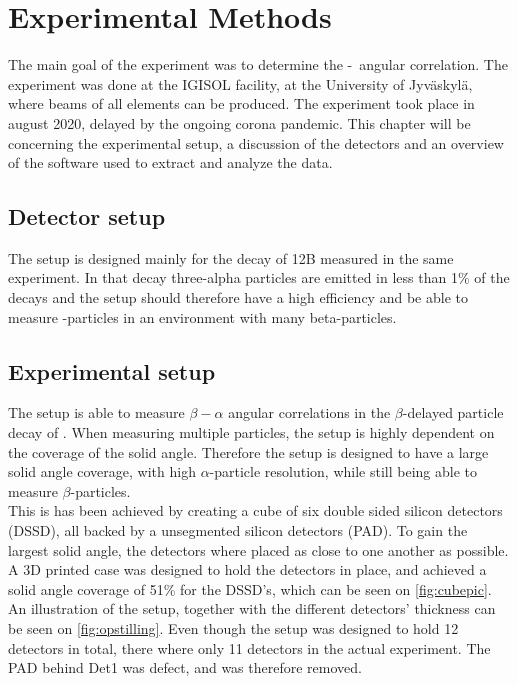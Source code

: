 \chapter{Experimental Methods}
The main goal of the experiment was to determine the \be-\al\ angular correlation. The experiment was done at the IGISOL facility, at the University of Jyväskylä, where beams of all elements can be produced. The experiment took place in august 2020, delayed by the ongoing corona pandemic. This chapter will be concerning the experimental setup, a discussion of the detectors and an overview of the software used to extract and analyze the data. 

\section{Detector setup}

The setup is designed mainly for the decay of 12B measured in the same experiment. In that decay three-alpha particles are emitted in less than 1\% of the decays and the setup should therefore have a high efficiency and be able to measure \al-particles in an environment with many beta-particles. 
\section{Experimental setup}
The setup is able to measure $\beta-\alpha$ angular correlations in the $\beta$-delayed particle decay of . When measuring multiple particles, the setup is highly dependent on the coverage of the solid angle. Therefore the setup is designed to have a large solid angle coverage, with high $\alpha$-particle resolution, while still being able to measure $\beta$-particles.\\
This is has been achieved by creating a cube of six double sided silicon detectors (DSSD), all backed by a unsegmented silicon detectors (PAD). To gain the largest solid angle, the detectors where placed as close to one another as possible. A 3D printed case was designed to hold the detectors in place, and achieved a solid angle coverage of 51\% for the DSSD's, which can be seen on \cref{fig:cubepic}. An illustration of the setup, together with the different detectors' thickness can be seen on \cref{fig:opstilling}. 
Even though the setup was designed to hold 12 detectors in total, there where only 11 detectors in the actual experiment. The PAD behind Det1 was defect, and was therefore removed. 

